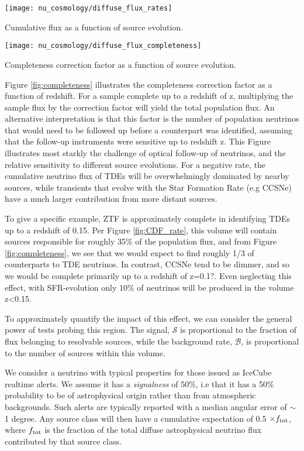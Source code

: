 \begin{marginfigure}
	\centering \texttt{[image: nu\_cosmology/diffuse\_flux\_rates]}
	\caption{Cumulative flux as a function of source evolution.}
	\label{fig:CDF_rate}
\end{marginfigure}

\begin{marginfigure}
	\centering \texttt{[image: nu\_cosmology/diffuse\_flux\_completeness]}
	\caption{Completeness correction factor as a function of source evolution.}
	\label{fig:completeness}
\end{marginfigure}

Figure \ref{fig:completeness} illustrates the completeness correction factor as a function of redshift. For a sample complete up to a redshift of z, multiplying the sample flux by the correction factor will yield the total population flux. An alternative interpretation is that this factor is the number of population neutrinos that would need to be followed up before a counterpart was identified, assuming that the follow-up instruments were sensitive up to redshift z. This Figure illustrates most starkly the challenge of optical follow-up of neutrinos, and the relative sensitivity to different source evolutions. For a negative rate, the cumulative neutrino flux of TDEs will be overwhelmingly dominated by nearby sources, while transients that evolve with the Star Formation Rate (e.g CCSNe) have a much larger contribution from more distant sources.

To give a specific example, ZTF is approximately complete in identifying TDEs up to a redshift of 0.15. Per Figure \ref{fig:CDF_rate}, this volume will contain sources responsible for roughly 35\% of the population flux, and from Figure \ref{fig:completeness}, we see that we would expect to find roughly 1/3 of counterparts to TDE neutrinos. In contrast, CCSNe tend to be dimmer, and so we would be complete primarily up to a redshift of z=0.1?. Even neglecting this effect, with SFR-evolution only 10\% of neutrinos will be produced in the volume z<0.15.

To approximately quantify the impact of this effect, we can consider the general power of tests probing this region. The signal, $\mathcal{S}$ is proportional to the fraction of flux belonging to resolvable sources, while the background rate, $\mathcal{B}$, is proportional to the number of sources within this volume.

We consider a neutrino with typical properties for those issued as IceCube realtime alerts. We assume it has a \emph{signalness} of 50\%, i.e that it has a 50\% probability to be of astrophysical origin rather than from atmospheric backgrounds. Such alerts are typically reported with a median angular error of $\sim$1 degree. Any source class will then have a cumulative expectation of 0.5 $\times f_{\textup{tot}}$, where $f_{\textup{tot}}$ is the fraction of the total diffuse astrophysical neutrino flux contributed by that source class. 
		
